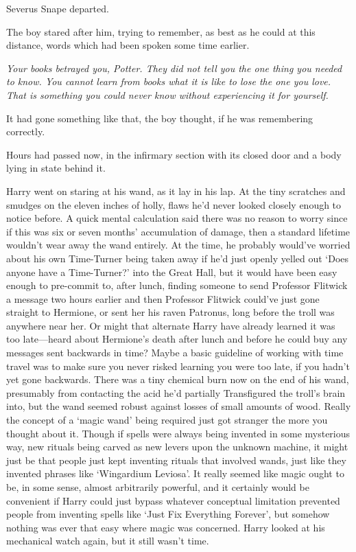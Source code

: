 Severus Snape departed.

The boy stared after him, trying to remember, as best as he could at this distance, words which had been spoken some time earlier.

\emph{Your books betrayed you, Potter. They did not tell you the one thing you needed to know. You cannot learn from books what it is like to lose the one you love. That is something you could never know without experiencing it for yourself.}

It had gone something like that, the boy thought, if he was remembering correctly.

\later

Hours had passed now, in the infirmary section with its closed door and a body lying in state behind it.

Harry went on staring at his wand, as it lay in his lap. At the tiny scratches and smudges on the eleven inches of holly, flaws he'd never looked closely enough to notice before. A quick mental calculation said there was no reason to worry since if this was six or seven months' accumulation of damage, then a standard lifetime wouldn't wear away the wand entirely. At the time, he probably would've worried about his own Time-Turner being taken away if he'd just openly yelled out `Does anyone have a Time-Turner?' into the Great Hall, but it would have been easy enough to pre-commit to, after lunch, finding someone to send Professor Flitwick a message two hours earlier and then Professor Flitwick could've just gone straight to Hermione, or sent her his raven Patronus, long before the troll was anywhere near her. Or might that alternate Harry have already learned it was too late—heard about Hermione's death after lunch and before he could buy any messages sent backwards in time? Maybe a basic guideline of working with time travel was to make sure you never risked learning you were too late, if you hadn't yet gone backwards. There was a tiny chemical burn now on the end of his wand, presumably from contacting the acid he'd partially Transfigured the troll's brain into, but the wand seemed robust against losses of small amounts of wood. Really the concept of a `magic wand' being required just got stranger the more you thought about it. Though if spells were always being invented in some mysterious way, new rituals being carved as new levers upon the unknown machine, it might just be that people just kept inventing rituals that involved wands, just like they invented phrases like `Wingardium Leviosa'. It really seemed like magic ought to be, in some sense, almost arbitrarily powerful, and it certainly would be convenient if Harry could just bypass whatever conceptual limitation prevented people from inventing spells like `Just Fix Everything Forever', but somehow nothing was ever that easy where magic was concerned. Harry looked at his mechanical watch again, but it still wasn't time.

